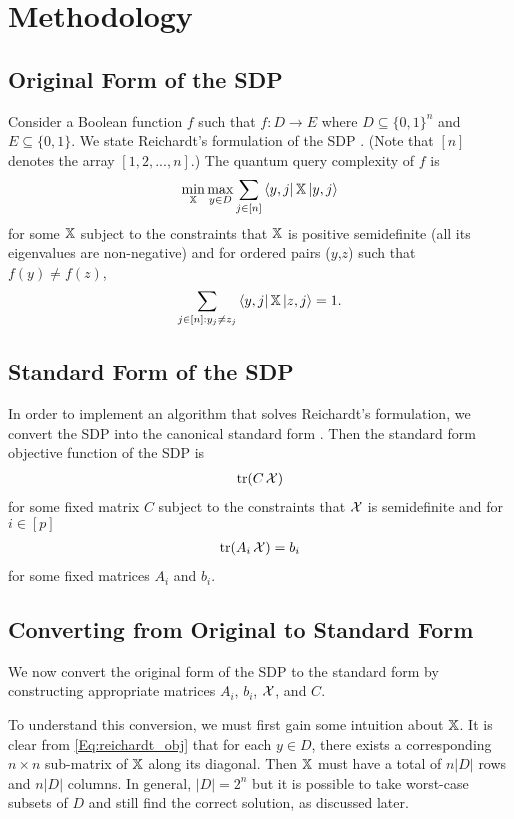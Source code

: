 \section{Methodology}\label{sec:method}

\subsection{Original Form of the SDP}
Consider a Boolean function $f$ such that
$f: D \rightarrow E$ where 
$D \subseteq {\{0,1\}}^n$ and $E \subseteq {\{0,1\}}$.
We state Reichardt's formulation of the SDP \cite{reichardt2009span}.
(Note that $[n]$ denotes the array
$[1,2,...,n]$.)
The quantum query complexity of $f$ is
\begin{align} \label{Eq:reichardt_obj} 
    \min_{\operatorname{\mathbb{X}}} \max_{y \in D} \sum_{j \in [n]} \bra{y,j}\operatorname{\mathbb{X}}\ket{y,j} 
\end{align}
for some $\operatorname{\mathbb{X}}$ subject to the constraints that $\operatorname{\mathbb{X}}$ is positive semidefinite
(all its eigenvalues are non-negative)
and for ordered pairs ($y$,$z$) such that $f(y) \neq f(z)$,
\begin{align}\label{Eq:reichardt_F0}
    \sum_{j \in [n]: y_j \ne z_j} 
    \bra{y,j} \operatorname{\mathbb{X}} \ket{z, j} = 1.
\end{align}

\subsection{Standard Form of the SDP}
In order to implement an algorithm that solves 
Reichardt's formulation, we convert the SDP
into the canonical standard form
\cite{boyd2004convex}.
Then the standard form objective function of the SDP is
\begin{align}\label{Eq:boyd_obj}
    \operatorname{\text{tr}}(C\operatorname{\mathcal{X}})
\end{align}
for some fixed matrix $C$ subject to the constraints
that $\operatorname{\mathcal{X}}$ is semidefinite and for $i \in [p]$
\begin{align} \label{Eq:boyd_trace}
    \operatorname{\text{tr}}(A_i \operatorname{\mathcal{X}}) = b_i
\end{align}
for some fixed matrices $A_i$ and $b_i$.

\subsection{Converting from Original to Standard Form}
We now convert the original form of the SDP to
the standard form by constructing appropriate matrices $A_i$, $b_i$, $\operatorname{\mathcal{X}}$, and $C$.

To understand this conversion, we must first gain some intuition about $\operatorname{\mathbb{X}}$.
It is clear from \cref{Eq:reichardt_obj} that for 
each $y \in D$, there exists a corresponding $n \times n$ sub-matrix of $\operatorname{\mathbb{X}}$ along its diagonal.
Then $\operatorname{\mathbb{X}}$ must have a total of $n|D|$ rows and $n|D|$ columns.
In general, $|D| = 2^n$ but it is possible to take 
worst-case subsets of $D$ and still find the correct solution, as discussed later.

